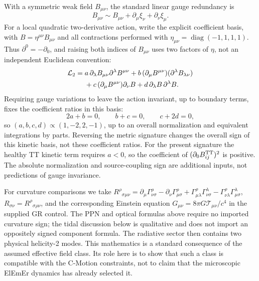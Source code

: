 \documentclass[11pt]{article}
\newcommand{\cmotion}{\mbox{C-Motion}}
\newcommand{\ElEmEr}{\mbox{ElEmEr}}
\theoremstyle{plain}
\theoremstyle{remark}
\begin{document}
With a symmetric weak field $B_{\mu\nu}$, the standard linear gauge redundancy is
\begin{equation}
B_{\mu\nu}\sim B_{\mu\nu}
+\partial_\mu\xi_\nu+\partial_\nu\xi_\mu.
\label{eq:linear-gauge}
\end{equation}
For a local quadratic two-derivative action, write the explicit coefficient
basis, with $B=\eta^{\mu\nu}B_{\mu\nu}$ and all contractions performed
with $\eta_{\mu\nu}=\operatorname{diag}(-1,1,1,1)$.
Thus $\partial^0=-\partial_0$, and raising both indices of $B_{\mu\nu}$
uses two factors of $\eta$, not an independent Euclidean convention:
\begin{align}
\mathcal L_2={}&a\,\partial_\lambda B_{\mu\nu}
                  \partial^\lambda B^{\mu\nu}
+b\,(\partial_\mu B^{\mu\nu})(\partial^\lambda B_{\lambda\nu})
\notag\\
&+c\,(\partial_\mu B^{\mu\nu})\partial_\nu B
+d\,\partial_\lambda B\,\partial^\lambda B.
\label{eq:FP-quadratic-basis}
\end{align}
Requiring gauge variations to leave the action invariant, up to boundary terms,
fixes the coefficient ratios in this basis:
\begin{equation}
2a+b=0,\qquad b+c=0,\qquad c+2d=0,
\label{eq:FP-kinetic-relations}
\end{equation}
so $(a,b,c,d)\propto(1,-2,2,-1)$, up to an overall normalization and
equivalent integrations by parts.  Reversing the metric signature changes
the overall sign of this kinetic basis, not these coefficient ratios.
For the present signature the healthy TT kinetic term requires $a<0$,
so the coefficient of $(\partial_0 B^{\rm TT}_{ij})^2$ is positive.
The absolute normalization and source-coupling sign are additional inputs,
not predictions of gauge invariance.

For curvature comparisons we take
$R^\rho{}_{\sigma\mu\nu}=\partial_\mu\Gamma^\rho_{\nu\sigma}
-\partial_\nu\Gamma^\rho_{\mu\sigma}
+\Gamma^\rho_{\mu\lambda}\Gamma^\lambda_{\nu\sigma}
-\Gamma^\rho_{\nu\lambda}\Gamma^\lambda_{\mu\sigma}$,
$R_{\sigma\nu}=R^\rho{}_{\sigma\rho\nu}$, and the corresponding Einstein
equation $G_{\mu\nu}=8\pi G\mathcal T_{\mu\nu}/c^4$ in the supplied GR
control.  The PPN and optical formulas above require no imported curvature
sign; the tidal discussion below is qualitative and does not import an
oppositely signed component formula.
The radiative sector then contains two physical helicity-2 modes.  This mathematics is a
standard consequence of the assumed effective field class.  Its role here is to show
that such a class is compatible with the \cmotion{} constraints, not to claim that the
microscopic \ElEmEr{} dynamics has already selected it.
\end{document}
